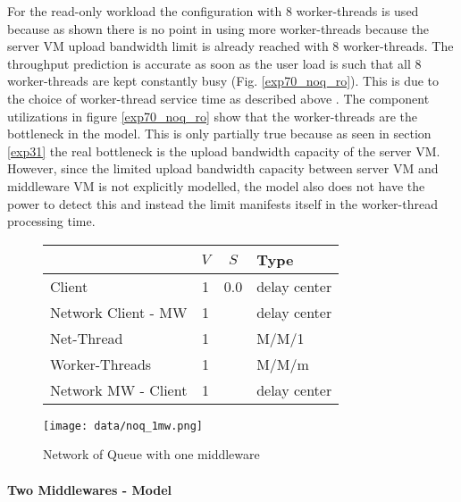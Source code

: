 \documentclass[report.tex]{subfiles}
\begin{document}
For the read-only workload the configuration with 8 worker-threads is used because as shown there is no point in using more worker-threads because the server VM upload bandwidth limit is already reached with 8 worker-threads. The throughput prediction is accurate as soon as the user load is such that all 8 worker-threads are kept constantly busy (Fig. \ref{exp70_noq_ro}). This is due to the choice of worker-thread service time as described above . The component utilizations in figure \ref{exp70_noq_ro} show that the worker-threads are the bottleneck in the model. This is only partially true because as seen in section \ref{exp31} the real bottleneck is the upload bandwidth capacity of the server VM. However, since the limited upload bandwidth capacity between server VM and middleware VM is not explicitly modelled, the model also does not have the power to detect this and instead the limit manifests itself in the worker-thread processing time.

\begin{figure}
	\begin{minipage}[c]{0.45\linewidth}
		\centering
		\scriptsize{
			\begin{tabular}{|l|c|c|l|}
				\hline 
				& $V$ & $S$ & Type \Tstrut\\ 
				\hline 
				Client & 1 & 0.0  & delay center \Tstrut\\ 
				\hline 
				Network Client - MW & 1 &  & delay center \Tstrut\\  
				Net-Thread & 1 &  & M/M/1 \\ 
				Worker-Threads & 1 &  & M/M/m  \\ 
				Network MW - Client & 1 &  & delay center \\ 
				\hline 
			\end{tabular} 
		} 
	\end{minipage}
	\hspace{0.5cm}
	\begin{minipage}[c]{0.45\linewidth}
	\centering
	\texttt{[image: data/noq\_1mw.png]}
\end{minipage}
	\caption{Network of Queue with one middleware}
	\label{exp70_noq_1mw}
\end{figure}


\paragraph{Two Middlewares - Model}
\end{document}
